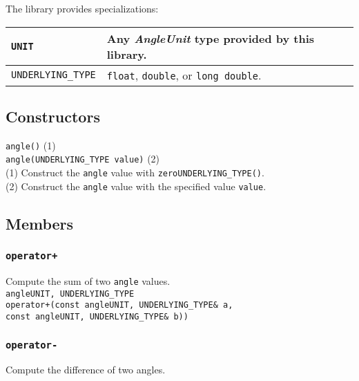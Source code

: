 \documentclass[oneside]{book}
\begin{document}
\noindent{}The library provides specializations:
\begin{center}
\begin{tabularx}{\textwidth}{|X|X|}
\hline
\texttt{UNIT}             & Any \textit{AngleUnit} type provided by this library.\\\hline
\texttt{UNDERLYING\_TYPE} & \texttt{float}, \texttt{double}, or \texttt{long double}.\\\hline
\end{tabularx}
\end{center}

\subsection{Constructors}

\noindent{}\texttt{angle}\texttt{(}\texttt{)} (1)\\
\noindent{}\texttt{angle}\texttt{(}\texttt{UNDERLYING\_TYPE value}\texttt{)} (2)\\

\noindent{}(1) Construct the \texttt{angle} value with \texttt{zero\textlangle UNDERLYING\_TYPE\textrangle()}.\\
(2) Construct the \texttt{angle} value with the specified value \texttt{value}.\\

\subsection{Members}
\subsubsection{\texttt{operator+}}
Compute the sum of two \texttt{angle} values.\\

\noindent\texttt{angle\textlangle UNIT, UNDERLYING\_TYPE\textrangle}\\
\texttt{operator+}\texttt{(}\texttt{const angle\textlangle UNIT, UNDERLYING\_TYPE\textrangle\& a}\texttt{,}\\
\texttt{const angle\textlangle UNIT, UNDERLYING\_TYPE\textrangle\& b)}\texttt{)}\\

\subsubsection{\texttt{operator-}}
Compute the difference of two angles.\\
\end{document}
